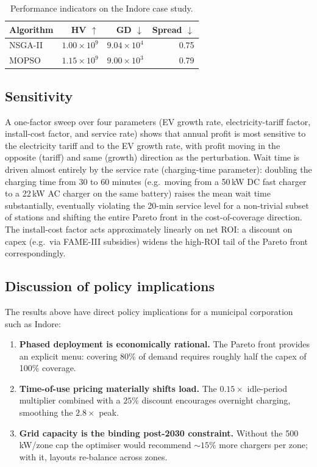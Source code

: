 \documentclass[conference]{IEEEtran}
\begin{document}
\begin{table}[t]
  \centering
  \caption{Performance indicators on the Indore case study.}
  \label{tab:indicators}
  \begin{tabular}{lrrr}
    \toprule
    Algorithm & HV $\uparrow$ & GD $\downarrow$ & Spread $\downarrow$ \\
    \midrule
    NSGA-II   & $1.00\!\times\!10^{9}$  & $9.04\!\times\!10^{4}$ & 0.75 \\
    MOPSO     & $1.15\!\times\!10^{9}$  & $9.00\!\times\!10^{3}$ & 0.79 \\
    \bottomrule
  \end{tabular}
\end{table}

\subsection{Sensitivity}
\label{subsec:sensitivity}
A one-factor sweep over four parameters (EV growth rate,
electricity-tariff factor, install-cost factor, and service rate)
shows that annual profit is most sensitive to the electricity
tariff and to the EV growth rate, with profit moving in the
opposite (tariff) and same (growth) direction as the perturbation.
Wait time is driven almost entirely by the service rate
(charging-time parameter): doubling the charging time from 30 to
60 minutes (e.g.\ moving from a 50\,kW DC fast charger to a 22\,kW
AC charger on the same battery) raises the mean wait time
substantially, eventually violating the 20-min service level for a
non-trivial subset of stations and shifting the entire Pareto
front in the cost-of-coverage direction. The install-cost factor
acts approximately linearly on net ROI: a discount on capex
(e.g.\ via FAME-III subsidies) widens the high-ROI tail of the
Pareto front correspondingly.

\subsection{Discussion of policy implications}
\label{subsec:discussion}
The results above have direct policy implications for a municipal
corporation such as Indore:
\begin{enumerate}
\item \textbf{Phased deployment is economically rational.} The Pareto
      front provides an explicit menu: covering 80\% of demand
      requires roughly half the capex of 100\% coverage.
\item \textbf{Time-of-use pricing materially shifts load.} The
      $0.15\times$ idle-period multiplier combined with a
      $25\%$ discount encourages overnight charging, smoothing the
      $2.8\times$ peak.
\item \textbf{Grid capacity is the binding post-2030 constraint.}
      Without the 500\,kW/zone cap the optimiser would recommend
      $\sim 15\%$ more chargers per zone; with it, layouts re-balance
      across zones.
\end{enumerate}
\end{document}
